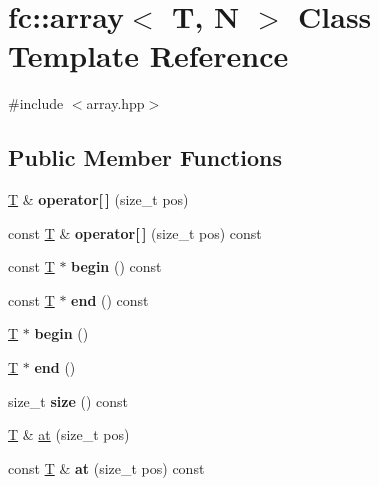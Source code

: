 \hypertarget{classfc_1_1array}{}\section{fc\+:\+:array$<$ T, N $>$ Class Template Reference}
\label{classfc_1_1array}


{\ttfamily \#include $<$array.\+hpp$>$}

\subsection*{Public Member Functions}
\begin{DoxyCompactItemize}
\item 
\mbox{\label{classfc_1_1array_a283e03832be570ecab25d31c38231b19}} 
\mbox{\hyperlink{struct_t}{T}} \& {\bfseries operator\mbox{[}$\,$\mbox{]}} (size\+\_\+t pos)
\item 
\mbox{\label{classfc_1_1array_a1a3c8fbc155e9df3228a43fc3a7afbf1}} 
const \mbox{\hyperlink{struct_t}{T}} \& {\bfseries operator\mbox{[}$\,$\mbox{]}} (size\+\_\+t pos) const
\item 
\mbox{\label{classfc_1_1array_a29e689954d48fc0071b371f9dcabbab3}} 
const \mbox{\hyperlink{struct_t}{T}} $\ast$ {\bfseries begin} () const
\item 
\mbox{\label{classfc_1_1array_ab4aec799ddf29f465dfada03150fbe0e}} 
const \mbox{\hyperlink{struct_t}{T}} $\ast$ {\bfseries end} () const
\item 
\mbox{\label{classfc_1_1array_a2746dadf6a4b351c3498892b66c30ca7}} 
\mbox{\hyperlink{struct_t}{T}} $\ast$ {\bfseries begin} ()
\item 
\mbox{\label{classfc_1_1array_a024394992afa86a8c99a44d5c827b80d}} 
\mbox{\hyperlink{struct_t}{T}} $\ast$ {\bfseries end} ()
\item 
\mbox{\label{classfc_1_1array_a0a4696737886d8a01c8eb75e2d234dc0}} 
size\+\_\+t {\bfseries size} () const
\end{DoxyCompactItemize}
\textbf{ }\par
\begin{DoxyCompactItemize}
\item 
\mbox{\hyperlink{struct_t}{T}} \& \mbox{\hyperlink{classfc_1_1array_a55e7e4a0eea7f9e72b66fdf2000097d0}{at}} (size\+\_\+t pos)
\item 
\mbox{\label{classfc_1_1array_a8f581faf523bc2f8f67102f893e821ea}} 
const \mbox{\hyperlink{struct_t}{T}} \& {\bfseries at} (size\+\_\+t pos) const
\end{DoxyCompactItemize}

